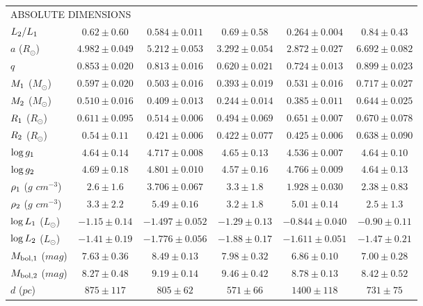 \documentclass[fleqn,usenatbib]{mnras}
\begin{document}
\begin{table*}
\begin{center}
\begin{tabular}{lccccc}
\\ [-2ex]
\multicolumn{6}{l}{\scriptsize ABSOLUTE DIMENSIONS}  \\

${L_{\rm 2}/L_{\rm 1}}$ & $0.62 \pm 0.60$ & $0.584 \pm 0.011$ & $0.69 \pm 0.58$ & $0.264 \pm 0.004$ & $0.84 \pm 0.43$ \\
${a}$ {($R_{\odot}$)} & $4.982 \pm 0.049$ & $5.212 \pm 0.053$ & $3.292 \pm 0.054$ & $2.872 \pm 0.027$ & $6.692 \pm 0.082$ \\
${q}$ & $0.853 \pm 0.020$ & $0.813 \pm 0.016$ & $0.620 \pm 0.021$ & $0.724 \pm 0.013$ & $0.899 \pm 0.023$ \\
${M_{\rm 1}}$ {($M_{\odot}$)} & $0.597 \pm 0.020$ & $0.503 \pm 0.016$ & $0.393 \pm 0.019$ & $0.531 \pm 0.016$ & $0.717 \pm 0.027$ \\
${M_{\rm 2}}$ {($M_{\odot}$)} & $0.510 \pm 0.016$ & $0.409 \pm 0.013$ & $0.244 \pm 0.014$ & $0.385 \pm 0.011$ & $0.644 \pm 0.025$ \\
${R_{\rm 1}}$ {($R_{\odot}$)} & $0.611 \pm 0.095$ & $0.514 \pm 0.006$ & $0.494 \pm 0.069$ & $0.651 \pm 0.007$ & $0.670 \pm 0.078$ \\
${R_{\rm 2}}$ {($R_{\odot}$)} & $0.54 \pm 0.11$ & $0.421 \pm 0.006$ & $0.422 \pm 0.077$ & $0.425 \pm 0.006$ & $0.638 \pm 0.090$ \\
${\log g_{\rm 1}}$ & $4.64 \pm 0.14$ & $4.717 \pm 0.008$ & $4.65 \pm 0.13$ & $4.536 \pm 0.007$ & $4.64 \pm 0.10$ \\
${\log g_{\rm 2}}$ & $4.69 \pm 0.18$ & $4.801 \pm 0.010$ & $4.57 \pm 0.16$ & $4.766 \pm 0.009$ & $4.64 \pm 0.13$ \\
${\rho_{\rm 1}}$ {($g$ $cm^{-3}$)} & $2.6 \pm 1.6$ & $3.706 \pm 0.067$ & $3.3 \pm 1.8$ & $1.928 \pm 0.030$ & $2.38 \pm 0.83$ \\
${\rho_{\rm 2}}$ {($g$ $cm^{-3}$)} & $3.3 \pm 2.2$ & $5.49 \pm 0.16$ & $3.2 \pm 1.8$ & $5.01 \pm 0.14$ & $2.5 \pm 1.3$ \\

${\log L_{\rm 1}}$ {($L_{\odot}$)} & $-1.15 \pm 0.14$ & $-1.497 \pm 0.052$ & $-1.29 \pm 0.13$ & $-0.844 \pm 0.040$ & $-0.90 \pm 0.11$ \\
${\log L_{\rm 2}}$ {($L_{\odot}$)} & $-1.41 \pm 0.19$ & $-1.776 \pm 0.056$ & $-1.88 \pm 0.17$ & $-1.611 \pm 0.051$ & $-1.47 \pm 0.21$ \\
${M_{\rm bol,1}}$ {($mag$)} & $7.63 \pm 0.36$ & $8.49 \pm 0.13$ & $7.98 \pm 0.32$ & $6.86 \pm 0.10$ & $7.00 \pm 0.28$ \\
${M_{\rm bol,2}}$ {($mag$)} & $8.27 \pm 0.48$ & $9.19 \pm 0.14$ & $9.46 \pm 0.42$ & $8.78 \pm 0.13$ & $8.42 \pm 0.52$ \\
${d}$ {($pc$)} & $875 \pm 117$ & $805 \pm 62$ & $571 \pm 66$ & $1400 \pm 118$ & $731 \pm 75$ \\


\hline %
\end{tabular}
\end{center}
\end{table*}
\end{document}
